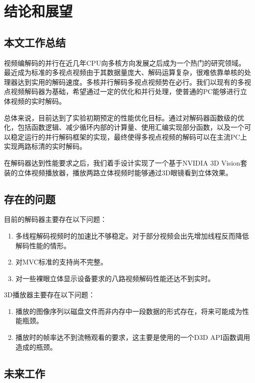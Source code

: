 

\chapter{结论和展望}
\label{cha:conclusionandforesight}

\section{本文工作总结}
\label{sec:conclusion}
视频编解码的并行在近几年CPU向多核方向发展之后成为一个热门的研究领域。最近成为标准的多视点视频由于其数据量庞大、解码运算复杂，很难依靠单核的处理器达到实用的解码速度。多核并行解码多视点视频势在必行。我们以现有的多视点视频解码器为基础，希望通过一定的优化和并行处理，使普通的PC能够进行立体视频的实时解码。

总体来说，目前达到了实验初期预定的性能优化目标。通过对解码器函数级的优化，包括函数逻辑、减少循环内部的计算量、使用汇编实现部分函数，以及一个可以稳定运行的并行解码框架的实现，最终使得多视点视频的解码可以在主流PC上实现两路标清的实时解码。

在解码器达到性能要求之后，我们着手设计实现了一个基于NVIDIA 3D Vision套装的立体视频播放器，播放两路立体视频时能够通过3D眼镜看到立体效果。

\section{存在的问题}
\label{sec:probremained}

目前的解码器主要存在以下问题：
\begin{enumerate}
\item 多线程解码视频时的加速比不够稳定。对于部分视频会出先增加线程反而降低解码性能的情形。
\item 对MVC标准的支持尚不完整。
\item 对一些裸眼立体显示设备要求的八路视频解码性能还达不到实时。
\end{enumerate}

3D播放器主要存在以下问题：
\begin{enumerate}
\item 播放的图像序列以磁盘文件而非内存中一段数据的形式存在，将来可能成为性能瓶颈。
\item 播放时的帧率达不到流畅观看的要求，这主要是使用的一个D3D API函数调用造成的瓶颈。
\end{enumerate}


\section{未来工作}
\label{sec:futurework}

